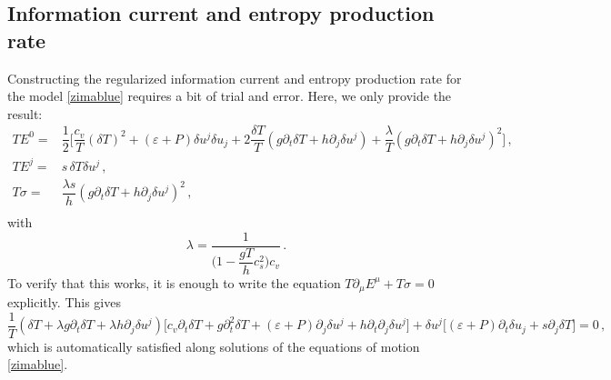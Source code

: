 \documentclass[a4paper, amsfonts, amssymb, amsmath, reprint, showkeys, nofootinbib, twoside,notitlepage,onecolumn,preprintnumbers]{revtex4-2}
\theoremstyle{definition}
\theoremstyle{theorem}
\theoremstyle{corollary}
\begin{document}
\subsection{Information current and entropy production rate}

Constructing the regularized information current and entropy production rate for the model \eqref{zimablue} requires a bit of trial and error. Here, we only provide the result:
\begin{equation}\label{INFOONA2}
\begin{split}
TE^0 ={}& \dfrac{1}{2} \bigg[ \dfrac{c_v}{T} (\delta T)^2 +(\varepsilon{+}P)\delta u^j \delta u_j +2 \dfrac{\delta T}{T} (g \partial_t \delta T +h \partial_j \delta u^j) + \dfrac{\lambda}{T} (g \partial_t \delta T +h \partial_j \delta u^j)^2 \bigg] \, ,\\
TE^j ={}& s \, \delta T \delta u^j \, ,\\
T\sigma ={}& \dfrac{\lambda s}{h} (g\partial_t \delta T +h \partial_j \delta u^j)^2 \, , \\
\end{split}
\end{equation}
with
\begin{equation}\label{lambdone}
\lambda = \dfrac{1}{\bigg(1- \dfrac{gT}{h} c_s^2 \bigg) c_v} \, .
\end{equation}
To verify that this works, it is enough to write the equation $T\partial_\mu E^\mu +T\sigma=0$ explicitly. This gives
\begin{equation}
\dfrac{1}{T} (\delta T {+}\lambda g \partial_t \delta T {+}\lambda h \partial_j \delta u^j)\big[ c_v \partial_t \delta T+g \partial^2_t \delta T+(\varepsilon{+}P)\partial_j \delta u^j+h \partial_t \partial_j \delta u^j\big]+\delta u^j \big[(\varepsilon{+}P)\partial_t \delta u_j+s\partial_j \delta T \big]=0 \, ,
\end{equation}
which is automatically satisfied along solutions of the equations of motion \eqref{zimablue}.
\end{document}
